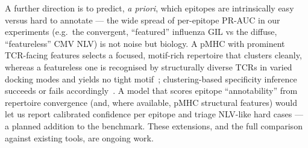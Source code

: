 \documentclass[11pt]{article}
\theoremstyle{oldplain}
\theoremstyle{oldrem}
\begin{document}
A further direction is to predict, \emph{a priori}, which epitopes are intrinsically easy versus hard
to annotate --- the wide spread of per-epitope PR-AUC in our experiments (e.g.\ the convergent,
``featured'' influenza GIL vs the diffuse, ``featureless'' CMV NLV) is not noise but biology. A pMHC
with prominent TCR-facing features selects a focused, motif-rich repertoire that clusters cleanly,
whereas a featureless one is recognised by structurally diverse TCRs in varied docking modes and yields
no tight motif~\cite{Turner2005,Yang2017,Song2017,Peng2014}; clustering-based specificity inference
succeeds or fails accordingly~\cite{Hudson2024}. A model that scores epitope ``annotability'' from
repertoire convergence (and, where available, pMHC structural features) would let us report calibrated
confidence per epitope and triage NLV-like hard cases --- a planned addition to the benchmark. These
extensions, and the full comparison against existing tools, are ongoing work.



\end{document}
